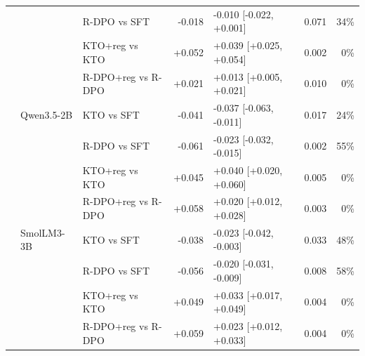 \begin{table}[t]
\begin{tabular}{lllrlrr}
 &  & R-DPO vs SFT & -0.018 & -0.010 [-0.022, +0.001] & 0.071 & 34\% \\
 &  & KTO+reg vs KTO & +0.052 & +0.039 [+0.025, +0.054] & 0.002 & 0\% \\
 &  & R-DPO+reg vs R-DPO & +0.021 & +0.013 [+0.005, +0.021] & 0.010 & 0\% \\
 & Qwen3.5-2B & KTO vs SFT & -0.041 & -0.037 [-0.063, -0.011] & 0.017 & 24\% \\
 &  & R-DPO vs SFT & -0.061 & -0.023 [-0.032, -0.015] & 0.002 & 55\% \\
 &  & KTO+reg vs KTO & +0.045 & +0.040 [+0.020, +0.060] & 0.005 & 0\% \\
 &  & R-DPO+reg vs R-DPO & +0.058 & +0.020 [+0.012, +0.028] & 0.003 & 0\% \\
 & SmolLM3-3B & KTO vs SFT & -0.038 & -0.023 [-0.042, -0.003] & 0.033 & 48\% \\
 &  & R-DPO vs SFT & -0.056 & -0.020 [-0.031, -0.009] & 0.008 & 58\% \\
 &  & KTO+reg vs KTO & +0.049 & +0.033 [+0.017, +0.049] & 0.004 & 0\% \\
 &  & R-DPO+reg vs R-DPO & +0.059 & +0.023 [+0.012, +0.033] & 0.004 & 0\% \\
\bottomrule
\end{tabular}
\end{table}
